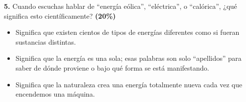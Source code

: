 \documentclass[12pt, letterpaper]{article}
\newif\ifshowanswers
\newcommand{\casillaVerdadera}{\ifshowanswers \textcolor{blue}{$\blacksquare$} \else $\square$ \fi}
\newcommand{\casillaFalsa}{\ifshowanswers $\square$ \else $\square$ \fi}
\begin{document}
	\vspace{0.5cm}
	\noindent \textbf{5.} Cuando escuchas hablar de ``energía eólica'', ``eléctrica'', o ``calórica'', ¿qué significa esto científicamente? \hfill\textbf{(20\%)}
	
	\vspace{0.4cm} 
	\begin{itemize}[itemsep=0.5cm] 
		\item[ \casillaFalsa ] Significa que existen cientos de tipos de energías diferentes como si fueran sustancias distintas. 
		\item[ \casillaVerdadera ] Significa que la energía es una sola; esas palabras son solo ``apellidos'' para saber de dónde proviene o bajo qué forma se está manifestando. 
		\item[ \casillaFalsa ] Significa que la naturaleza crea una energía totalmente nueva cada vez que encendemos una máquina. 
	\end{itemize}
	\vspace{1.5cm}
	
\end{document}
